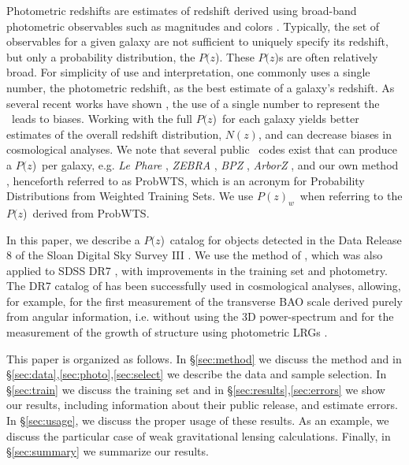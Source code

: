 \documentclass[12pt,preprint]{aastex}
\newcommand{\pofz}{$P(z$)}
\newcommand{\pofzw}{$P(z)_w$\ }
\newcommand{\acronym}{ProbWTS}
\begin{document}
Photometric redshifts are estimates of redshift derived using broad-band
photometric observables such as magnitudes and colors \citep{bau62,pus82,koo85,loh86,con95}. 
Typically, the set of observables for a given galaxy are not sufficient to uniquely specify its
redshift, but only a probability distribution, the \pofz.  These \pofz s are
often relatively broad. For simplicity of use and interpretation, one commonly
uses a single number, the photometric redshift, as the best estimate of a
galaxy's redshift.  As several recent works have shown
\citep{man08,CunhaPhotoz09,wit09,bor10,abr11}, the use of a single number to
represent the \photoz\ leads to biases.  Working with the full \pofz\ for each
galaxy yields better estimates of the overall redshift distribution, $N(z)$,
and can decrease biases in cosmological analyses.  We note that several public
\photoz\ codes exist that can produce a \pofz\ per galaxy, e.g.  {\it Le Phare}
\citep{arn99,ilb06}, {\it ZEBRA} \citep{fel06}, {\it BPZ} \citep{coe06}, {\it
ArborZ} \citep{ger10}, and our own method \citep{CunhaPhotoz09}, henceforth
referred to as \acronym, which is an acronym for Probability Distributions from
Weighted Training Sets.  We use \pofzw when referring to the \pofz\  derived from
\acronym.



In this paper, we describe a \pofz\ catalog for objects detected in the Data
Release 8 \citep[SDSS DR8;][]{dr8} of the Sloan Digital Sky Survey III
\citep[SDSS III;][]{Eisenstein2011}.  We use the method of
\citet{CunhaPhotoz09}, which was also applied to SDSS DR7 \citep{dr7}, with
improvements in the training set and photometry.  The DR7 catalog of
\cite{CunhaPhotoz09} has been successfully used in cosmological analyses,
allowing, for example, for the first measurement of the transverse BAO scale
derived purely from angular information, i.e. without using the 3D
power-spectrum \citep{car11}  and for the measurement of the growth of
structure using photometric LRGs \citep{cro11}. 

This paper is organized as follows.  In \S \ref{sec:method} we discuss the
method and in \S \ref{sec:data},\ref{sec:photo},\ref{sec:select} we describe
the data and sample selection. In \S \ref{sec:train} we discuss the training
set and in \S \ref{sec:results},\ref{sec:errors} we show our results, including
information about their public release, and
estimate errors.  In \S \ref{sec:usage}, we discuss the proper usage of these
results. As an example, we discuss the particular case of weak gravitational
lensing calculations.  %
Finally, in \S \ref{sec:summary} we summarize our results.
\end{document}
